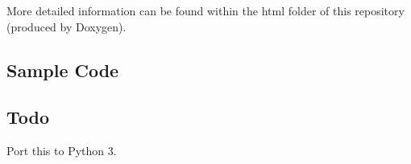 More detailed information can be found within the html folder of this repository (produced by Doxygen).

\subsection*{Sample Code}

\subsection*{Todo}

Port this to Python 3. 